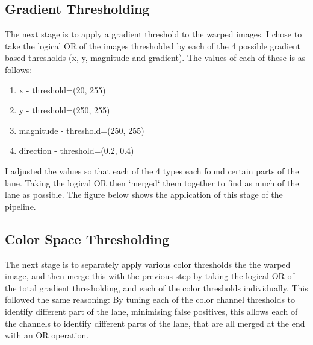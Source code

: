 \documentclass[letterpaper,12pt]{article}
\begin{document}
\subsection{Gradient Thresholding}
The next stage is to apply a gradient threshold to the warped images. I chose to take the logical OR of the images thresholded by each of the 4 possible gradient based thresholds (x, y, magnitude and gradient). The values of each of these is as follows:
\begin{enumerate}
\item x - threshold=(20, 255)
\item y - threshold=(250, 255)
\item magnitude - threshold=(250, 255)
\item direction - threshold=(0.2, 0.4)
\end{enumerate}
I adjusted the values so that each of the 4 types each found certain parts of the lane. Taking the logical OR then `merged` them together to find as much of the lane as possible. The figure below shows the application of this stage of the pipeline.
\FloatBarrier
\begin{figure}
\centering
{}
\end{figure}
\FloatBarrier
\subsection{Color Space Thresholding}
The next stage is to separately apply various color thresholds the the warped image, and then merge this with the previous step by taking the logical OR of the total gradient thresholding, and each of the color thresholds individually. This followed the same reasoning: By tuning each of the color channel thresholds to identify different part of the lane, minimising false positives, this allows each of the channels to identify different parts of the lane, that are all merged at the end with an OR operation. 
\end{document}
